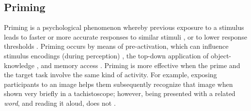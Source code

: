 \documentclass{sigchi}
\begin{document}
%
%
%

\subsection{Priming}
Priming is a psychological phenomenon whereby previous exposure to a 
stimulus leads to faster or more accurate responses to similar stimuli 
\cite{Ghuman17062008},
or to lower response thresholds \cite{BJOP1826}.  
Priming occurs by means of pre-activation, which can influence
stimulus encodings (during perception) \cite{BJOP1826}, 
the top-down application of object-knowledge \cite{Ghuman17062008},
and memory access \cite{beller1971priming}.
Priming is more 
effective when the prime and the target task involve the same kind of 
activity.  For example, exposing participants to an image helps them 
subsequently recognize that image when shown very briefly in a 
tachistoscope; however, being presented with a related \textit{word}, 
and reading it aloud, does not \cite{BJOP1796}.
\end{document}
